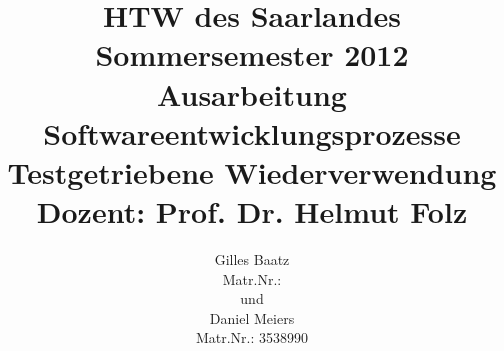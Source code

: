 

\title{%
\large HTW des Saarlandes\\
Sommersemester 2012\\
Ausarbeitung Softwareentwicklungsprozesse\\[10mm]
{\LARGE Testgetriebene Wiederverwendung}\\[10mm]
Dozent: Prof. Dr. Helmut Folz}

\author{%
Gilles Baatz\\
Matr.Nr.: \\[5mm]
und\\[5mm]
Daniel Meiers\\
Matr.Nr.: 3538990
}



\maketitle
 
\tableofcontents
\listoffigures











\printbibliography

